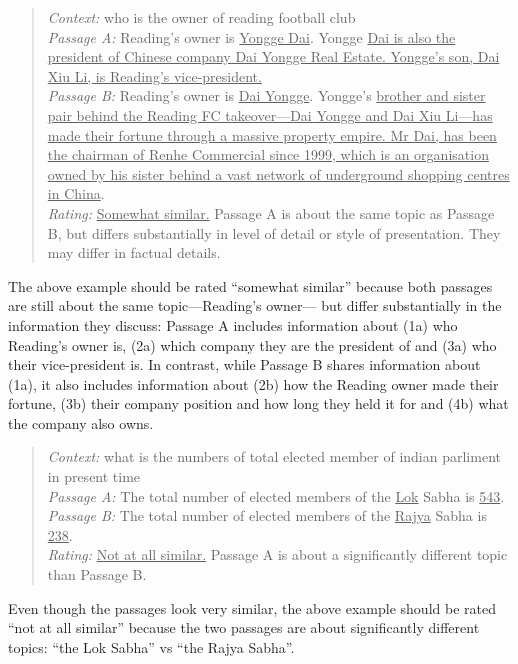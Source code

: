 \documentclass[11pt]{article}
\begin{document}
\begin{quote}
\textit{Context:}
who is the owner of reading football club \\
\textit{Passage A:}
Reading's owner is \ul{Yongge Dai}. Yongge \ul{Dai is also the president of Chinese company Dai Yongge Real Estate. Yongge's son, Dai Xiu Li, is Reading's vice-president.} \\
\textit{Passage B:}
Reading's owner is \ul{Dai Yongge}. Yongge's \ul{brother and sister pair behind the Reading FC takeover---Dai Yongge and Dai Xiu Li---has made their fortune through a massive property empire. Mr Dai, has been the chairman of Renhe Commercial since 1999, which is an organisation owned by his sister behind a vast network of underground shopping centres in China}. \\
\textit{Rating:}
\ul{Somewhat similar.} Passage A is about the same topic as Passage B, but differs substantially in level of detail or style of presentation. They may differ in factual details.
\end{quote}

The above example should be rated ``somewhat similar'' because both passages are still about the same topic—Reading's owner— but differ substantially in the information they discuss: Passage A includes information about (1a) who Reading's owner is, (2a) which company they are the president of and (3a) who their vice-president is. In contrast, while Passage B shares information about (1a), it also includes information about (2b) how the Reading owner made their fortune, (3b) their company position and how long they held it for and (4b) what the company also owns.


\begin{quote}
\textit{Context:}
what is the numbers of total elected member of indian parliment in present time \\
\textit{Passage A:}
The total number of elected members of the \ul{Lok} Sabha is \ul{543}. \\
\textit{Passage B:}
The total number of elected members of the \ul{Rajya} Sabha is \ul{238}. \\
\textit{Rating:}
\ul{Not at all similar.} Passage A is about a significantly different topic than Passage B.
\end{quote}

Even though the passages look very similar, the above example should be rated ``not at all similar'' because the two passages are about significantly different topics: ``the Lok Sabha'' vs ``the Rajya Sabha''.
\end{document}
